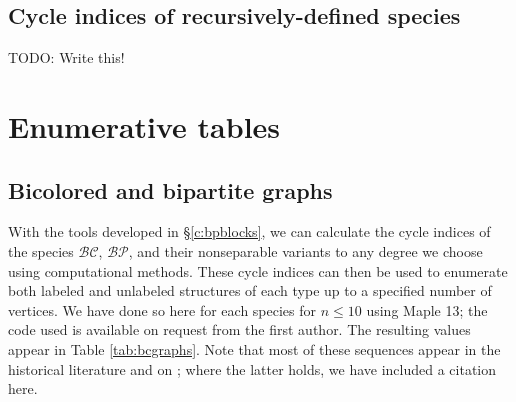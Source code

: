 \documentclass[distribution,draft]{brandiss} %
\numberwithin{section}{chapter}
\numberwithin{figure}{chapter}
\begin{document}
\section{Cycle indices of recursively-defined species}\label{s:comprecurs}
TODO: Write this!

\chapter{Enumerative tables}\label{c:enum}
\section{Bicolored and bipartite graphs}\label{s:bpenum}
With the tools developed in \S \ref{c:bpblocks}, we can calculate the cycle indices of the species $\mathcal{BC}$, $\mathcal{BP}$, and their nonseparable variants to any degree we choose using computational methods.
These cycle indices can then be used to enumerate both labeled and unlabeled structures of each type up to a specified number of vertices.
We have done so here for each species for $n \leq 10$ using Maple 13; the code used is available on request from the first author.
The resulting values appear in Table \ref{tab:bcgraphs}.
Note that most of these sequences appear in the historical literature and on \cite{oeis}; where the latter holds, we have included a citation here.
\end{document}
